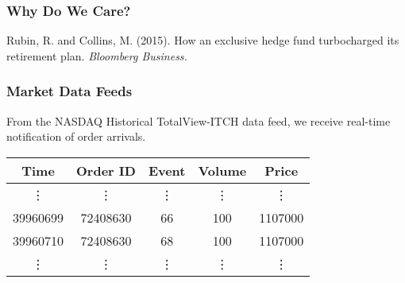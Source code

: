 %
%    
    
\begin{frame}
\frametitle{Why Do We Care?}
{\tiny Rubin, R. and Collins, M. (2015). How an exclusive hedge fund turbocharged its retirement plan. \textit{Bloomberg Business.}}
\end{frame}

    
\begin{frame}[t]
\frametitle{Market Data Feeds}
From the NASDAQ Historical TotalView-ITCH data feed, we receive real-time notification of order arrivals.

\begin{center}
\begin{table}
\begin{tabular}{@{} *{5}{c} @{}}
\toprule
Time & Order ID & Event & Volume & Price \\
\midrule
\vdots & \vdots & \vdots & \vdots & \vdots \\
39960699 &72408630 & 66 & 100 & 1107000 \\
39960710 & 72408630 & 68 & 100 & 1107000 \\
\vdots & \vdots & \vdots & \vdots & \vdots \\
\bottomrule
\end{tabular}
\end{table}
\end{center}
\end{frame}
        

